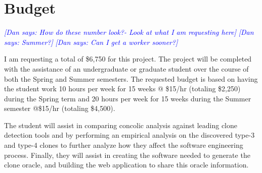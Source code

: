 \documentclass{article}
\newcommand{\dan}[1]{\textcolor{blue}{{\it [Dan says: #1]}}}
\begin{document}
\section{Budget}


\dan{How do these number look?- Look at what I am requesting here}
\dan{Summer?}
\dan{Can I get a worker sooner?}

I am requesting a total of \$6,750 for this project. The project will be completed with the assistance of an undergraduate or graduate student over the course of both the Spring and Summer semesters. The requested budget is based on having the student work 10 hours per week for 15 weeks @ \$15/hr (totaling \$2,250) during the Spring term and 20 hours per week for 15 weeks during the Summer semester @\$15/hr (totaling \$4,500).

The student will assist in comparing concolic analysis against leading clone detection tools and by performing an empirical analysis on the discovered type-3 and type-4 clones to further analyze how they affect the software engineering process. Finally, they will assist in creating the software needed to generate the clone oracle, and building the web application to share this oracle information.


%


\end{document}
